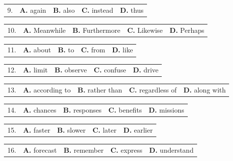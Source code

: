 \documentclass[UTF8,11pt]{ctexart}
\begin{document}
\noindent\begin{tabularx}{\linewidth}{@{}lXXXX@{}}9. & \textbf{A.} again & \textbf{B.} also & \textbf{C.} instead & \textbf{D.} thus\\\end{tabularx}\par

\noindent\begin{tabularx}{\linewidth}{@{}lXXXX@{}}10. & \textbf{A.} Meanwhile & \textbf{B.} Furthermore & \textbf{C.} Likewise & \textbf{D.} Perhaps\\\end{tabularx}\par

\noindent\begin{tabularx}{\linewidth}{@{}lXXXX@{}}11. & \textbf{A.} about & \textbf{B.} to & \textbf{C.} from & \textbf{D.} like\\\end{tabularx}\par

\noindent\begin{tabularx}{\linewidth}{@{}lXXXX@{}}12. & \textbf{A.} limit & \textbf{B.} observe & \textbf{C.} confuse & \textbf{D.} drive\\\end{tabularx}\par

\noindent\begin{tabularx}{\linewidth}{@{}lXXXX@{}}13. & \textbf{A.} according to & \textbf{B.} rather than & \textbf{C.} regardless of & \textbf{D.} along with\\\end{tabularx}\par

\noindent\begin{tabularx}{\linewidth}{@{}lXXXX@{}}14. & \textbf{A.} chances & \textbf{B.} responses & \textbf{C.} benefits & \textbf{D.} missions\\\end{tabularx}\par

\noindent\begin{tabularx}{\linewidth}{@{}lXXXX@{}}15. & \textbf{A.} faster & \textbf{B.} slower & \textbf{C.} later & \textbf{D.} earlier\\\end{tabularx}\par

\noindent\begin{tabularx}{\linewidth}{@{}lXXXX@{}}16. & \textbf{A.} forecast & \textbf{B.} remember & \textbf{C.} express & \textbf{D.} understand\\\end{tabularx}\par
\end{document}
